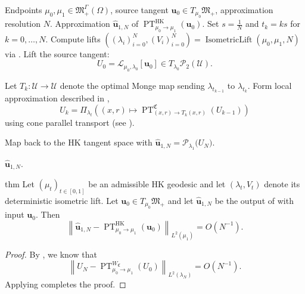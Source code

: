 \documentclass[11pt]{article}
\newcommand{\PT}{\operatorname{PT}}
\begin{document}
\begin{algorithm}[H]
\caption{Approximate HK parallel transport via cone transport}
\label{alg: HK parallel transport}
\begin{algorithmic}[1]
\Require Endpoints $\mu_0, \mu_1 \in \mathfrak{M}_+^\Gamma(\Omega)$, source tangent
$\mathbf u_0 \in T_{\mu_0}\mathfrak{M}_+$, approximation resolution $N$.
\Ensure Approximation
$\widehat{\mathbf u}_{1,N}$ of
$\PT^{\mathrm{HK}}_{\mu_0\rightarrow\mu_1}(\mathbf u_0)$.
\State Set $s = \frac{1}{N}$ and $
t_k = ks$ for $k=0,\dots, N.$
\State Compute lifts $\left((\lambda_i)_{i = 0}^N, (V_i)_{i = 0}^N\right) = \operatorname{IsometricLift}(\mu_0, \mu_1, N)$ via .
\State Lift the source tangent:
\[
U_{0} = \mathcal{L}_{\mu_0,\lambda_0}[\mathbf u_0]
\in T_{\lambda_0}\mathcal P_2(\mathcal U).
\]

    \State Let $T_k:\mathcal U\to\mathcal U$ denote the optimal Monge map sending
    $\lambda_{t_{k-1}}$ to $\lambda_{t_k}$.
    \State Form local approximation described in ,
    \[ U_{k} = \Pi_{\lambda_t}\left((x,r) \mapsto \PT^\mathfrak{C}_{(x,r) \rightarrow T_k(x,r)}\left( U_{k-1}\right) \right)\]
    \hspace{\algorithmicindent} using cone parallel transport (see ). 
\EndFor

\State Map back to the HK tangent space with $\widehat{\mathbf u}_{1, N}
=
\mathcal{P}_{\lambda_1}\big(U_{N}\big).$

\State \Return $\widehat{\mathbf u}_{1, N}$.
\end{algorithmic}
\end{algorithm}

\begin{restatable}{thm}{} \label{parallel transport approx entire geodesic}
    Let $(\mu_t)_{t\in[0,1]}$ be an admissible HK geodesic and let
    $(\lambda_t,V_t)$ denote its deterministic isometric lift. Let $\mathbf u_0 \in T_{\mu_0}\mathfrak{M}_+$ and let
    $\widehat{\mathbf u}_{1, N}$ be the output of
     with input $\mathbf u_0$. Then
    \[
    \left\|
    \widehat{\mathbf u}_{1, N}
    -
    \PT^{\mathrm{HK}}_{\mu_0\rightarrow\mu_1}(\mathbf u_0)
    \right\|_{L^2(\mu_1)}
    = O(N^{-1}).
    \]
\end{restatable}

\begin{proof}
    By , we know that 
    \[\left\|U_N  - \PT_{\mu_0  \rightarrow \mu_1}^{W_\mathfrak{C}}(U_0)\right\|_{L^2(\lambda_N)} = O(N^{-1}).\]
    Applying  completes the proof.
\end{proof}
\end{document}
